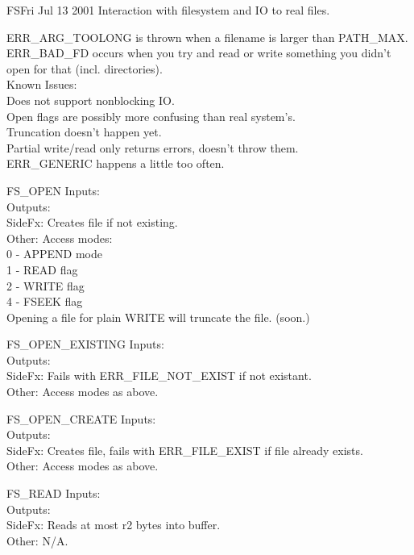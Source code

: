 \begin{scmodule}{FS}{\perjsk}{\perjsk}{Fri Jul 13 2001}
Interaction with filesystem and IO to real files.
\end{scmodule}
ERR\_ARG\_TOOLONG is thrown when a filename is larger than PATH\_MAX.\\
ERR\_BAD\_FD occurs when you try and read or write something you didn't
open for that (incl. directories).\\
Known Issues:\\
Does not support nonblocking IO.\\
Open flags are possibly more confusing than real system's.\\
Truncation doesn't happen yet. \FIXME\\
Partial write/read only returns errors, doesn't throw them.\\
ERR\_GENERIC happens a little too often.\FIXME
\begin{sccall}{FS\_OPEN}
  Inputs: \\
 Outputs: \\
  SideFx: Creates file if not existing.\\
   Other: Access modes:\\
   	  0 - APPEND mode\\
	  1 - READ flag\\
	  2 - WRITE flag\\
	  4 - FSEEK flag\\
	  Opening a file for plain WRITE will truncate the file. (soon.)
\end{sccall}
\begin{sccall}{FS\_OPEN\_EXISTING}
  Inputs: \\
 Outputs: \\
  SideFx: Fails with ERR\_FILE\_NOT\_EXIST if not existant.\\
   Other: Access modes as above.
\end{sccall}
\begin{sccall}{FS\_OPEN\_CREATE}
  Inputs: \\
 Outputs: \\
  SideFx: Creates file, fails with ERR\_FILE\_EXIST if file already exists.\\
   Other: Access modes as above.
\end{sccall}
\begin{sccall}{FS\_READ}
  Inputs: \\
 Outputs: \\
  SideFx: Reads at most r2 bytes into buffer.\\
   Other: N/A.
\end{sccall}
